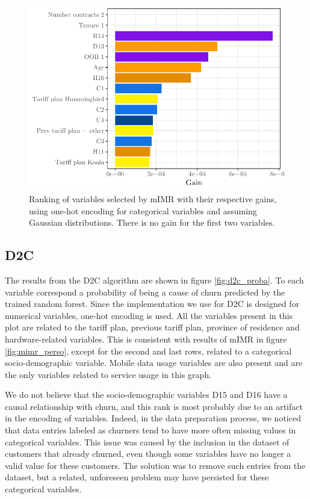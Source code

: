 \begin{figure}
    \centering
    \includegraphics[width=0.9\linewidth]{figures/mimr_original.pdf}
    \caption{Ranking of variables selected by mIMR with their respective gains,
    using one-hot encoding for categorical variables and assuming Gaussian
    distributions. There is no gain for the first two variables.}
    \label{fig:mimr_original}
\end{figure}

\subsection{D2C}

The results from the D2C algorithm are shown in figure \ref{fig:d2c_proba}. To
each variable correspond a probability of being a cause of churn predicted by
the trained random forest. Since the implementation we use for D2C is designed
for numerical variables, one-hot encoding is used. All the variables present in
this plot are related to the tariff plan, previous tariff plan, province of
residence and hardware-related variables. This is consistent with results of
mIMR in figure \ref{fig:mimr_perso}, except for the second and last rows,
related to a categorical socio-demographic variable. Mobile data usage variables
are also present and are the only variables related to service usage in this
graph.

We do not believe that the socio-demographic variables D15 and D16 have a causal
relationship with churn, and this rank is most probably due to an artifact in
the encoding of variables. Indeed, in the data preparation process, we noticed
that data entries labeled as churners tend to have more often missing values in
categorical variables. This issue was caused by the inclusion in the dataset of
customers that already churned, even though some variables have no longer a valid
value for these customers. The solution was to remove such entries from the
dataset, but a related, unforeseen problem may have persisted for these
categorical variables.


